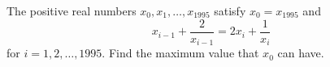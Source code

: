 The positive real numbers $x_0, x_1, \ldots, x_{1995}$ satisfy $x_0 = x_{1995}$ and
\[ x_{i-1} + \frac{2}{x_{i-1}} = 2x_i + \frac{1}{x_i} \]
for $i = 1, 2, \ldots, 1995$. Find the maximum value that $x_0$ can have.

